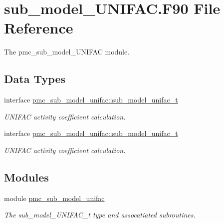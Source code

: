 \hypertarget{sub__model___u_n_i_f_a_c_8_f90}{}\section{sub\+\_\+model\+\_\+\+U\+N\+I\+F\+A\+C.\+F90 File Reference}
\label{sub__model___u_n_i_f_a_c_8_f90}


The pmc\+\_\+sub\+\_\+model\+\_\+\+U\+N\+I\+F\+AC module.  


\subsection*{Data Types}
\begin{DoxyCompactItemize}
\item 
interface \mbox{\hyperlink{structpmc__sub__model__unifac_1_1sub__model__unifac__t}{pmc\+\_\+sub\+\_\+model\+\_\+unifac\+::sub\+\_\+model\+\_\+unifac\+\_\+t}}
\begin{DoxyCompactList}\small\item\em U\+N\+I\+F\+AC activity coefficient calculation. \end{DoxyCompactList}\item 
interface \mbox{\hyperlink{structpmc__sub__model__unifac_1_1sub__model__unifac__t}{pmc\+\_\+sub\+\_\+model\+\_\+unifac\+::sub\+\_\+model\+\_\+unifac\+\_\+t}}
\begin{DoxyCompactList}\small\item\em U\+N\+I\+F\+AC activity coefficient calculation. \end{DoxyCompactList}\end{DoxyCompactItemize}
\subsection*{Modules}
\begin{DoxyCompactItemize}
\item 
module \mbox{\hyperlink{namespacepmc__sub__model__unifac}{pmc\+\_\+sub\+\_\+model\+\_\+unifac}}
\begin{DoxyCompactList}\small\item\em The sub\+\_\+model\+\_\+\+U\+N\+I\+F\+A\+C\+\_\+t type and assocatiated subroutines. \end{DoxyCompactList}\end{DoxyCompactItemize}
